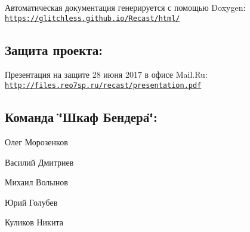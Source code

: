 Автоматическая документация генерируется с помощью Doxygen\-: \href{https://glitchless.github.io/Recast/html/}{\tt https\-://glitchless.\-github.\-io/\-Recast/html/}

\subsection*{Защита проекта\-:}

Презентация на защите 28 июня 2017 в офисе Mail.\-Ru\-: \href{http://files.reo7sp.ru/recast/presentation.pdf}{\tt http\-://files.\-reo7sp.\-ru/recast/presentation.\-pdf}

\subsection*{Команда \char`\"{}Шкаф Бендера\char`\"{}\-:}


\begin{DoxyItemize}
\item Олег Морозенков
\item Василий Дмитриев
\item Михаил Волынов
\item Юрий Голубев
\item Куликов Никита 
\end{DoxyItemize}